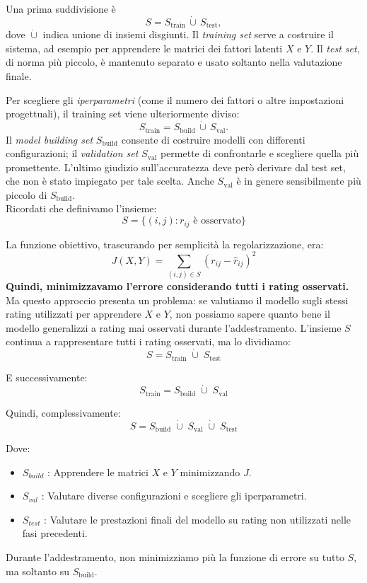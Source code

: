 Una prima suddivisione è
\[
S=S_{\mathrm{train}}\,\dot\cup\,S_{\mathrm{test}},
\]
dove $\dot\cup$ indica unione di insiemi disgiunti. Il \emph{training set} serve a costruire il sistema, ad esempio per apprendere le matrici dei fattori latenti $X$ e $Y$. Il \emph{test set}, di norma più piccolo, è mantenuto separato e usato soltanto nella valutazione finale.

Per scegliere gli \emph{iperparametri} (come il numero dei fattori o altre impostazioni progettuali), il training set viene ulteriormente diviso:
\[
S_{\mathrm{train}}=S_{\mathrm{build}}\,\dot\cup\,S_{\mathrm{val}}.
\]
Il \emph{model building set} $S_{\mathrm{build}}$ consente di costruire modelli con differenti configurazioni; il \emph{validation set} $S_{\mathrm{val}}$ permette di confrontarle e scegliere quella più promettente. L'ultimo giudizio sull'accuratezza deve però derivare dal test set, che non è stato impiegato per tale scelta. Anche $S_{\mathrm{val}}$ è in genere sensibilmente più piccolo di $S_{\mathrm{build}}$.
\\
Ricordati che definivamo l'insieme:
\[
S=\{(i,j):r_{ij}\text{ è osservato}\}
\]

La funzione obiettivo, trascurando per semplicità la regolarizzazione, era:
\[
J(X,Y)=\sum_{(i,j)\in S}(r_{ij}-\hat r_{ij})^2
\]
\textbf{Quindi, minimizzavamo l'errore considerando tutti i rating osservati.}
Ma questo approccio presenta un problema: se valutiamo il modello sugli stessi rating utilizzati per apprendere \(X\) e \(Y\), non possiamo sapere quanto bene il modello generalizzi a rating mai osservati durante l'addestramento.
L'insieme \(S\) continua a rappresentare tutti i rating osservati, ma lo dividiamo:
\[
S=S_{\text{train}}\;\dot\cup\;S_{\text{test}}
\]

E successivamente:
\[
S_{\text{train}}=S_{\text{build}}\;\dot\cup\;S_{\text{val}}
\]

Quindi, complessivamente:
\[
\boxed{S=S_{\text{build}}\;\dot\cup\;S_{\text{val}}\;\dot\cup\;S_{\text{test}}}
\]

Dove:
\begin{itemize}
    \item \textbf{$S_{build}$} : Apprendere le matrici \(X\) e \(Y\) minimizzando \(J\).
    \item \textbf{$S_{val}$} : Valutare diverse configurazioni e scegliere gli iperparametri.
    \item \textbf{$S_{test}$} : Valutare le prestazioni finali del modello su rating non utilizzati nelle fasi precedenti.
\end{itemize}
Durante l'addestramento, non minimizziamo più la funzione di errore su tutto \(S\), ma soltanto su \(S_{\text{build}}\).

